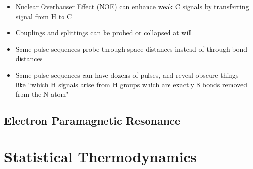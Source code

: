\documentclass[12pt, openany, letterpaper]{memoir}
\begin{document}
\begin{itemize}
\begin{itemize}
		\item Nuclear Overhauser Effect (NOE) can enhance weak C signals by transferring signal from H to C
		\item Couplings and splittings can be probed or collapsed at will
		\item Some pulse sequences probe through-space distances instead of through-bond distances
		\item Some pulse sequences can have dozens of pulses, and reveal obscure things like ``which H signals arise from H groups which are exactly 8 bonds removed from the N atom"
	\end{itemize}
\end{itemize}
\section{Electron Paramagnetic Resonance}



\chapter{Statistical Thermodynamics}
\end{document}
